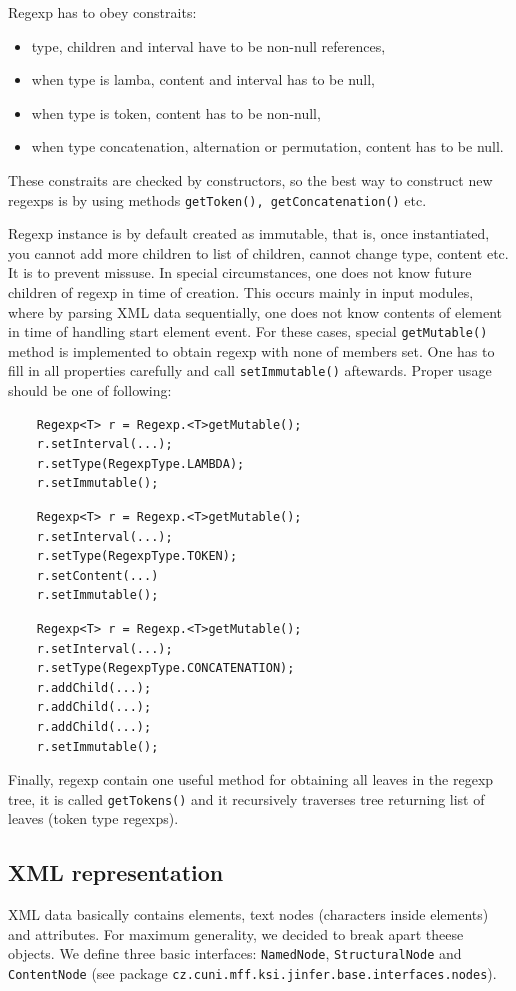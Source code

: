 \documentclass[a4paper,10pt,oneside]{article}
\newcommand{\code}[1]{\texttt{#1}}
\begin{document}
Regexp has to obey constraits:
\begin{itemize}
	\item type, children and interval have to be non-null references,
	\item when type is lamba, content and interval has to be null,
	\item when type is token, content has to be non-null,
	\item when type concatenation, alternation or permutation, content has to be null.
\end{itemize}
These constraits are checked by constructors, so the best way to construct new regexps is by using 
methods \code{getToken(), getConcatenation()} etc.

Regexp instance is by default created as immutable, that is, once instantiated, you cannot add more children to list of children, cannot change type, content etc. It is to prevent missuse. In special circumstances, one does not know future children of regexp in time of creation. This occurs mainly in input modules, where by parsing XML data sequentially, one does not know contents of element in time of handling start element event.
For these cases, special \code{getMutable()} method is implemented to obtain regexp with none of members set. One has to fill in all properties carefully and call \code{setImmutable()} aftewards. Proper usage should be one of following:
\begin{verbatim}
	Regexp<T> r = Regexp.<T>getMutable();
	r.setInterval(...);
	r.setType(RegexpType.LAMBDA);
	r.setImmutable();
\end{verbatim}
\begin{verbatim}
	Regexp<T> r = Regexp.<T>getMutable();
	r.setInterval(...);
	r.setType(RegexpType.TOKEN);
	r.setContent(...)
	r.setImmutable();
\end{verbatim}
\begin{verbatim}
	Regexp<T> r = Regexp.<T>getMutable();
	r.setInterval(...);
	r.setType(RegexpType.CONCATENATION);
	r.addChild(...);
	r.addChild(...);
	r.addChild(...);
	r.setImmutable();
\end{verbatim}
	
Finally, regexp contain one useful method for obtaining all leaves in the regexp tree, it is called \code{getTokens()} and it recursively traverses tree returning list of leaves (token type regexps).

\subsection{XML representation}
XML data basically contains elements, text nodes (characters inside elements) and attributes.
For maximum generality, we decided to break apart theese objects.
We define three basic interfaces: \code{NamedNode}, \code{StructuralNode} and \code{ContentNode} (see package \code{cz.cuni.mff.ksi.jinfer.base.interfaces.nodes}). 
\end{document}
